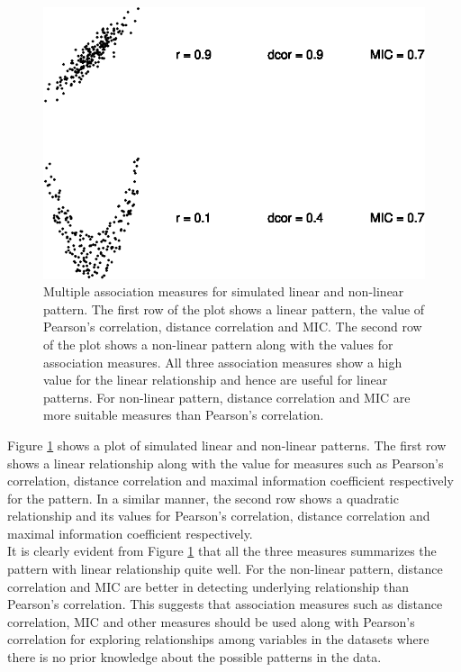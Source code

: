 \begin{Schunk}
\begin{figure}

{\centering \includegraphics{rj_paper_files/figure-latex/motivation-patterns-1} 

}

\caption[Multiple association measures for simulated linear and non-linear pattern]{Multiple association measures for simulated linear and non-linear pattern. The first row of the plot shows a linear pattern, the value of Pearson's correlation, distance correlation and MIC. The second row of the plot shows a non-linear pattern along with the values for association measures. All three association measures show a high value for the linear relationship and hence are useful for linear patterns. For non-linear pattern, distance correlation and MIC are more suitable measures than Pearson's correlation.}\label{fig:motivation-patterns}
\end{figure}
\end{Schunk}

Figure \ref{fig:motivation-patterns} shows a plot of simulated linear
and non-linear patterns. The first row shows a linear relationship along
with the value for measures such as Pearson's correlation, distance
correlation and maximal information coefficient respectively for the
pattern. In a similar manner, the second row shows a quadratic
relationship and its values for Pearson's correlation, distance
correlation and maximal information coefficient respectively.\\
It is clearly evident from Figure \ref{fig:motivation-patterns} that all
the three measures summarizes the pattern with linear relationship quite
well. For the non-linear pattern, distance correlation and MIC are
better in detecting underlying relationship than Pearson's correlation.
This suggests that association measures such as distance correlation,
MIC and other measures should be used along with Pearson's correlation
for exploring relationships among variables in the datasets where there
is no prior knowledge about the possible patterns in the data.

